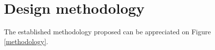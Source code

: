 \section{Design methodology}

The established methodology proposed can be appreciated on Figure \ref{methodology}.

